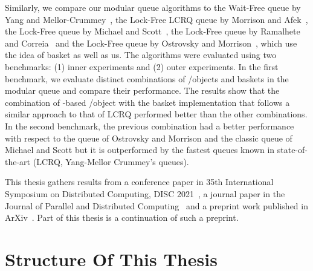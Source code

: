 Similarly, we compare our modular queue algorithms to the Wait-Free queue by Yang and Mellor-Crummey~\cite{DBLP_conf_ppopp_YangM16}, the Lock-Free LCRQ queue by Morrison and Afek~\cite{ppopp2013x86queues}, the Lock-Free queue by Michael and Scott~\cite{DBLP_conf_podc_MichaelS96}, the Lock-Free queue by Ramalhete and Correia~\cite{Ramalhete_Correia_MPMC_2016} and the Lock-Free queue by Ostrovsky and Morrison~\cite{scalingconcurrent2020}, which use the idea of basket as well as us. The algorithms were evaluated using two benchmarks: (1) inner experiments and (2) outer experiments. In the first benchmark, we evaluate distinct combinations of \LL/\IC objects and baskets in the modular queue and compare their performance. The results show that the combination of \CAS-based \LL/\IC object with the basket implementation that follows a similar approach to that of LCRQ performed better than the other combinations. In the second benchmark, the previous combination had a better performance with respect to the queue of Ostrovsky and Morrison and the classic queue of Michael and Scott but it is outperformed by the fastest queues known in state-of-the-art (LCRQ, Yang-Mellor Crummey's queues).

This thesis gathers results from a conference paper in 35th International Symposium on Distributed Computing, DISC 2021~\cite{DBLP_conf_wdag_CastanedaP21}, a journal paper in the Journal of Parallel and Distributed Computing~\cite{DBLP_journals_jpdc_CastanedaP24} and a preprint work published in ArXiv~\cite{arxiv_2205_06323}. Part of this thesis is a continuation of such a preprint.
\section{\label{section:Organization}Structure Of This Thesis}

